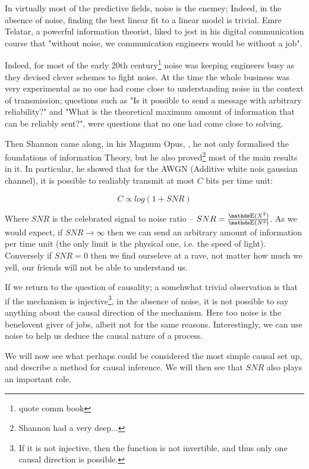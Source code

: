 In virtually most of the predictive fields, noise is the enemey; Indeed, in the absence of noise, finding the
best linear fit to a linear model is trivial. Emre Telatar, a powerful information theorist, liked to jest
in his digital communication course that "without noise, we communication engineers would be without a job".

Indeed, for most of the early 20th century\footnote{quote comm book} noise was keeping engineers busy as they 
devised clever schemes to fight noise. At the time the whole business was very experimental as
no one had come close to understanding noise in the context of transmission; questions such 
as "Is it possible to send a message with arbitrary reliability?" and "What is the theoretical maximum amount
of information that can be reliably sent?", were questions that no one had come close to solving.

Then Shannon came along, in his Magnum Opus, \cite{shannon}, he not only formalised the foundations of information
Theory, but he also proved\footnote{Shannon had a very deep...} most of the main results in it. In particular, he
showed that for the AWGN (Additive white nois gaussian channel), it is possible to realiably transmit at most $C$
bits per time unit:

$$
C \propto log(1 + SNR)
$$

Where $SNR$ is the celebrated signal to noise ratio -- $SNR = \frac{\E(X^2)}{\E(N^2)}$. As we 
would expect, if $SNR \rightarrow \infty$ then we can send an arbitrary amount of information 
per time unit (the only limit is the physical one, i.e. the speed of light). Conversely if $SNR = 0$
then we find ourseleve at a rave, not matter how much we yell, our friends will not be able to 
understand us.

If we return to the question of causality; a somehwhat trivial observation is that if the mechanism 
is injective\footnote{If it is not injective, then the function is not invertible, and thus only one 
causal direction is possible.}, in the absence of noise, it is 
not possible to say anything about the causal direction of the mechanism. Here too noise is the
benelovent giver of jobs, albeit not for the same reasons. Interestingly, we can use noise to 
help us deduce the causal nature of a process. 

We will now see what perhaps could be considered the most simple causal set up, and describe a method
for causal inference. We will then see that $SNR$ also plays an important role.

